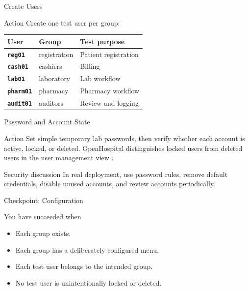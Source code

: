 \documentclass[presentation]{beamer}
\begin{document}
\begin{frame}[c]{Create Users}
\begin{block}{Action}
Create one test user per group:
\end{block}

\begin{center}
\scriptsize
\begin{tabular}{>{\bfseries}p{} p{} p{}}
\toprule
User & Group & Test purpose \\
\midrule
\texttt{reg01} & registration & Patient registration \\
\texttt{cash01} & cashiers & Billing \\
\texttt{lab01} & laboratory & Lab workflow \\
\texttt{pharm01} & pharmacy & Pharmacy workflow \\
\texttt{audit01} & auditors & Review and logging \\
\bottomrule
\end{tabular}
\end{center}
\end{frame}

\begin{frame}[c]{Password and Account State}
\begin{block}{Action}
Set simple temporary lab passwords, then verify whether each account is active, locked, or deleted.
OpenHospital distinguishes locked users from deleted users in the user management view
\cite{openhospital_user}.
\end{block}

\begin{exampleblock}{Security discussion}
In real deployment, use password rules, remove default credentials, disable unused accounts, and
review accounts periodically.
\end{exampleblock}
\end{frame}

\begin{frame}[c]{Checkpoint: Configuration}
\begin{block}{You have succeeded when}
\begin{itemize}
    \item Each group exists.
    \item Each group has a deliberately configured menu.
    \item Each test user belongs to the intended group.
    \item No test user is unintentionally locked or deleted.
\end{itemize}
\end{block}
\end{frame}
\end{document}
